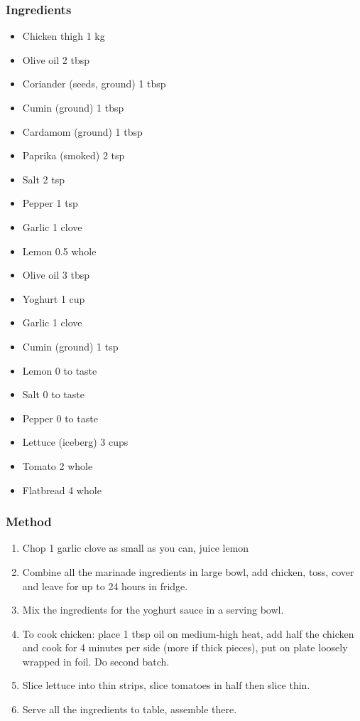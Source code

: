 \documentclass[]{article}
\begin{document}
\subsubsection*{\Large Ingredients}
\begin{multicols}{2}
\begin{itemize}
 \item Chicken thigh \hfill 1 kg
 \item Olive oil \hfill 2 tbsp
 \item Coriander (seeds, ground) \hfill 1 tbsp
 \item Cumin (ground) \hfill 1 tbsp
 \item Cardamom (ground) \hfill 1 tbsp
 \item Paprika (smoked) \hfill 2 tsp
 \item Salt \hfill 2 tsp
 \item Pepper \hfill 1 tsp
 \item Garlic \hfill 1 clove
 \item Lemon \hfill 0.5 whole
 \item Olive oil \hfill 3 tbsp
 \item Yoghurt \hfill 1 cup
 \item Garlic \hfill 1 clove
 \item Cumin (ground) \hfill 1 tsp
 \item Lemon \hfill 0 to taste
 \item Salt \hfill 0 to taste
 \item Pepper \hfill 0 to taste
 \item Lettuce (iceberg) \hfill 3 cups
 \item Tomato \hfill 2 whole
 \item Flatbread \hfill 4 whole
\end{itemize}
\end{multicols}
\subsubsection*{\Large Method}
\begin{enumerate}[font=\huge\color{accent}]
	\item Chop 1 garlic clove as small as you can, juice lemon
	\item Combine all the marinade ingredients in large bowl, add chicken, toss, cover and leave for up to 24 hours in fridge.
	\item Mix the ingredients for the yoghurt sauce in a serving bowl.
	\item To cook chicken: place 1 tbsp oil on medium-high heat, add half the chicken and cook for 4 minutes per side (more if thick pieces), put on plate loosely wrapped in foil. Do second batch.
	\item Slice lettuce into thin strips, slice tomatoes in half then slice thin.
	\item Serve all the ingredients to table, assemble there.
\end{enumerate}
\newpage
{}\label{rec:Gyros}
\end{document}
